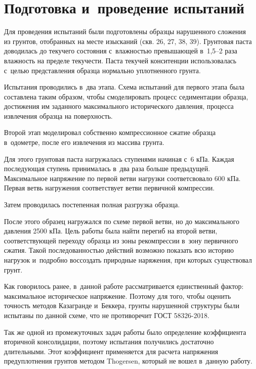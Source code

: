 \section{Подготовка и~проведение испытаний}

Для проведения испытаний были подготовлены образцы нарушенного сложения из грунтов, отобранных на месте изысканий (скв. 26, 27, 38, 39). Грунтовая паста доводилась до текучего состояния с~влажностью превышающей в~1,5--2 раза влажность на пределе текучести. 
Паста текучей конситенции использовалась с~целью представления образца нормально уплотненного грунта.

Испытания проводились в~два этапа.
Схема испытаний для первого этапа была составлена таким образом, чтобы смоделировать процесс седиментации образца, достижения им заданного максимального исторического давления, процесса извлечения образца на поверхность.

Второй этап моделировал собственно компрессионное сжатие образца в~одометре, после его извлечения из массива грунта.

Для этого грунтовая паста нагружалась ступенями начиная с~6 кПа.
Каждая последующая ступень принималась в~два раза больше предыдущей.
Максимальное напряжение по первой ветви нагрузки соответсвовало 600 кПа.
Первая ветвь нагружения соответствует ветви первичной компрессии.

Затем проводилась постепенная полная разгрузка образца.

После этого образец нагружался по схеме первой ветви, но до максимального давления 2500 кПа.
Цель работы была найти перегиб на второй ветви, соответствующей переходу образца из зоны рекомпрессии в~зону первичного сжатия.
Такой последованностью действий возможно показать всю историю нагрузок и~подробно воссоздать природные наряжения, при которых существовал грунт. 

Как говорилось ранее, в~данной работе рассматривается единственный фактор: максимальное историческое напряжение. Поэтому для того, чтобы оценить точность методов Казагранде и~Беккера, грунты нарушенной структуры были испытаны по данной схеме, что не противоречит ГОСТ 58326-2018.

Так же одной из промежуточных задач работы было определение коэффициента вторичной консолидации, поэтому испытания получились достаточно длительными. Этот коэффициент применяется для расчета напряжения предуплотнения грунтов методом Thogersen, который не вошел в~данную работу.
 
